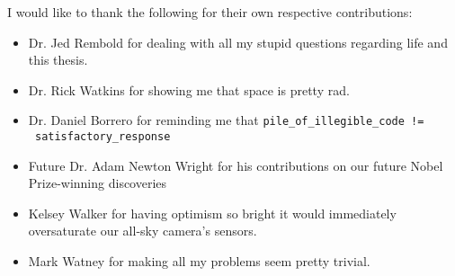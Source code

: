I would like to thank the following for their own respective contributions:
\begin{itemize}
	\item Dr. Jed Rembold for dealing with all my stupid questions regarding life and this thesis.

	\item Dr. Rick Watkins for showing me that space is pretty rad.

	\item Dr. Daniel Borrero for reminding me that \texttt{pile\_of\_illegible\_code !=} \\ \texttt{ satisfactory\_response}


	\item Future Dr. Adam Newton Wright for his contributions on our future Nobel Prize-winning discoveries

	\item Kelsey Walker for having optimism so bright it would immediately oversaturate our all-sky camera's sensors.

	\item Mark Watney for making all my problems seem pretty trivial.
\end{itemize}
